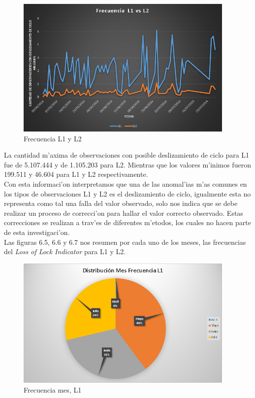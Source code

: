 \begin{figure}[H]
\centering
\includegraphics[width=0.95\textwidth]{images/Frecuency_L1_L2}
\caption{Frecuencia L1 y L2}
\label{fig:6.4}
\end{figure}

La cantidad m'axima de observaciones con posible deslizamiento de ciclo para L1 fue de 5.107.444 y de 1.105.203 para L2. Mientras que los valores m'inimos fueron 199.511 y 46.604 para L1 y L2 respectivamente. \\

Con esta informaci'on interpretamos que una de las anomal'ias m'as comunes en los tipos de observaciones L1 y L2 es el deslizamiento de ciclo, igualmente esta no representa como tal una falla del valor observado, solo nos indica que se debe realizar un proceso de correcci'on para hallar el valor correcto observado. Estas correcciones se realizan a trav'es de diferentes m'etodos, los cuales no hacen parte de esta investigaci'on. \\

Las figuras 6.5, 6.6 y 6.7 nos resumen por cada uno de los meses, las frecuencias del \emph{Loss of Lock Indicator} para L1 y L2. \\

\begin{figure}[H]
\centering
\includegraphics[width=0.95\textwidth]{images/Frecuency_Month_L1}
\caption{Frecuencia mes, L1}
\label{fig:6.5}
\end{figure}

